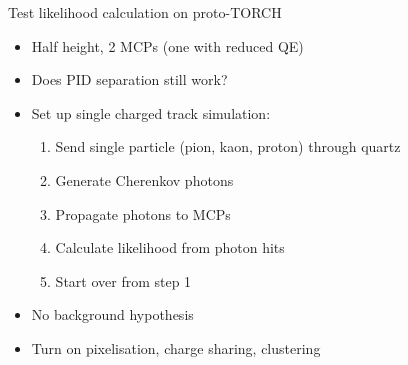 \documentclass{beamer}
\begin{document}
\begin{frame}{Test likelihood calculation on proto-TORCH}
  \begin{itemize}
    \setlength\itemsep{1.0em}
    \item{Half height, 2 MCPs (one with reduced QE)}
    \item{Does PID separation still work?}
    \item{Set up single charged track simulation:}
    \begin{enumerate}
      \setlength\itemsep{0.8em}
      \item{Send single particle (pion, kaon, proton) through quartz}
      \item{Generate Cherenkov photons}
      \item{Propagate photons to MCPs}
      \item{Calculate likelihood from photon hits}
      \item{Start over from step 1}
    \end{enumerate}
    \item{No background hypothesis}
    \item{Turn on pixelisation, charge sharing, clustering}
  \end{itemize}
\end{frame}
\end{document}

